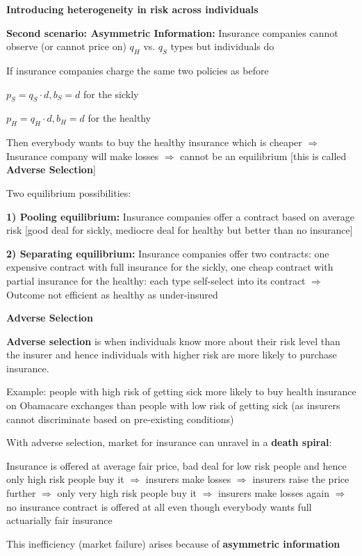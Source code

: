 \documentclass[landscape]{slides}
\begin{document}
\begin{slide}
\begin{center}
{\bf Introducing heterogeneity in risk across individuals}
\end{center}
\small
\textbf{Second scenario: Asymmetric Information:} Insurance companies
cannot observe (or cannot price on) $q_H$ vs. $q_S$ types but individuals do 

If insurance companies charge the same two policies as before

$p_S=q_S  \cdot d  , b_S=d$ for the sickly

$p_H=q_H  \cdot d  , b_H=d$ for the healthy

Then everybody wants to buy the healthy insurance which is cheaper $\Rightarrow$
Insurance company will make losses $\Rightarrow$ cannot be an equilibrium [this is
called \textbf{Adverse Selection}]

Two equilibrium possibilities:

\textbf{1) Pooling equilibrium:} Insurance companies offer a contract based on
average risk [good deal for sickly, mediocre deal for healthy but 
better than no insurance]

\textbf{2) Separating equilibrium:} Insurance companies offer two contracts: one
expensive contract with full insurance for the sickly, one cheap contract
with partial insurance for the healthy: each type self-select into its contract
$\Rightarrow$ Outcome not efficient as healthy as under-insured
\end{slide}



%


\begin{slide}
\begin{center}
{\bf Adverse Selection}
\end{center}

\textbf{Adverse selection} is when individuals know more about their risk level than
the insurer and hence individuals with higher risk are more likely to purchase insurance.

Example: people with high risk of getting sick more likely to buy health insurance on Obamacare exchanges than people with low risk of getting sick (as insurers cannot discriminate based on pre-existing conditions)

With adverse selection, market for insurance can unravel in a \textbf{death spiral}:

\small
Insurance is offered at average fair price, bad deal for low risk people and hence
only high risk people buy it $\Rightarrow$ insurers make losses $\Rightarrow$
insurers raise the price further $\Rightarrow$ only very high risk people buy it $\Rightarrow$ insurers make losses again
$\Rightarrow$ no insurance contract is offered at all even though everybody wants full actuarially fair insurance

\normalsize
This inefficiency (market failure) arises because of \textbf{asymmetric information}

\end{slide}
\end{document}
